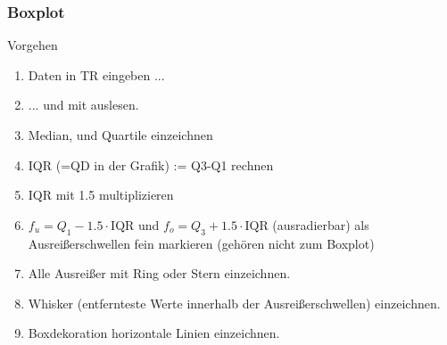 \begin{multicols}{2}
\subsubsection*{Boxplot}
Vorgehen
\begin{enumerate}
\item Daten in TR eingeben ...
\item ... und mit  auslesen.
\item Median, und Quartile einzeichnen
\item IQR (=QD in der Grafik) := Q3-Q1 rechnen
\item IQR mit 1.5 multiplizieren
\item $f_u = Q_1 - 1.5\cdot{}\textrm{IQR}$ und $f_o=Q_3 + 1.5\cdot{}\textrm{IQR}$ (ausradierbar) als
Ausreißerschwellen fein markieren (gehören nicht zum Boxplot)
\item Alle Ausreißer mit Ring oder Stern einzeichnen.
\item Whisker (entfernteste Werte innerhalb der Ausreißerschwellen)
einzeichnen.
\item Boxdekoration horizontale Linien einzeichnen.
\end{enumerate}
\end{multicols}


\newpage

